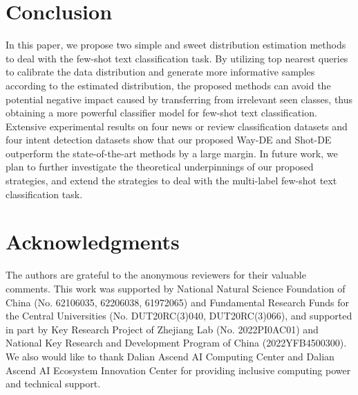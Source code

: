 \documentclass[letterpaper]{article} %
\begin{document}
\section{Conclusion}
In this paper, we propose two simple and sweet distribution estimation methods to deal with the few-shot text classification task. By utilizing top nearest queries to calibrate the data distribution and generate more informative samples according to the estimated distribution, the proposed methods can avoid the potential negative impact caused by transferring from irrelevant seen classes, thus obtaining a more powerful classifier model for few-shot text classification. Extensive experimental results on four news or review classification datasets and four intent detection datasets show that our proposed Way-DE and Shot-DE outperform the state-of-the-art methods by a large margin. In future work, we plan to further investigate the theoretical underpinnings of our proposed strategies, and extend the strategies to deal with the multi-label few-shot text classification task.

\section{Acknowledgments}
The authors are grateful to the anonymous reviewers for their valuable comments. This work was supported by National Natural Science Foundation of China (No. 62106035, 62206038, 61972065) and Fundamental Research Funds for the Central Universities (No. DUT20RC(3)040, DUT20RC(3)066), and supported in part by Key Research Project of Zhejiang Lab (No. 2022PI0AC01) and National Key Research and Development Program of China (2022YFB4500300). We also would like to thank Dalian Ascend AI Computing Center and Dalian Ascend AI Ecosystem Innovation Center for providing inclusive computing power and technical support.


\end{document}
